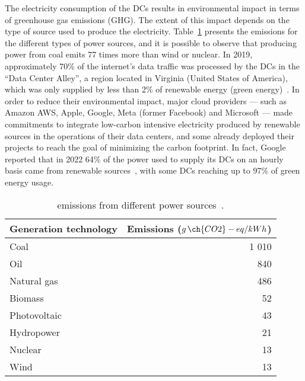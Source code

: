 The electricity consumption of the DCs results in environmental impact in terms of greenhouse gas emissions (GHG). The extent of this impact depends on the type of source used to produce the electricity. Table~\ref{tab:co2_power_sources} presents the emissions for the different types of power sources, and it is possible to observe that producing power from coal emits 77 times more  than wind or nuclear. In 2019, approximately 70\% of the internet's data traffic was processed by the DCs in the ``Data Center Alley'', a region located in Virginia (United States of America), which was only supplied by less than 2\% of renewable energy (green energy)~\cite{clicking_clean_virginia}. In order to reduce their environmental impact, major cloud providers --- such as Amazon AWS, Apple, Google, Meta (former Facebook) and Microsoft --- made commitments to integrate low-carbon intensive electricity produced by renewable sources in the operations of their data centers, and some already deployed their projects to reach the goal of minimizing the carbon footprint. In fact, Google reported that in 2022 64\% of the power used to supply its DCs on an hourly basis came from renewable sources~\cite{google_sustainability_report_2023}, with some DCs reaching up to 97\% of green energy usage.

\begin{table}[!ht]

\caption{  emissions from different power sources~\cite{nrel_lifecycle_2021}.}\label{tab:co2_power_sources} \centering

\begin{tabular}{|l|r|}
  \hline
  \textbf{Generation technology} & \textbf{Emissions ($g\,\ch{CO2}-eq/kWh$)}   \\
  \hline  
  Coal   & 1 010\\  
  \hline
  Oil   & 840\\
  \hline
  Natural gas   & 486\\
   \hline
  Biomass   & 52 \\
  \hline
  Photovoltaic   & 43 \\
  \hline
  Hydropower & 21 \\
  \hline
  Nuclear   & 13 \\
  \hline
  Wind   & 13 \\
  \hline
\end{tabular}
\end{table}


